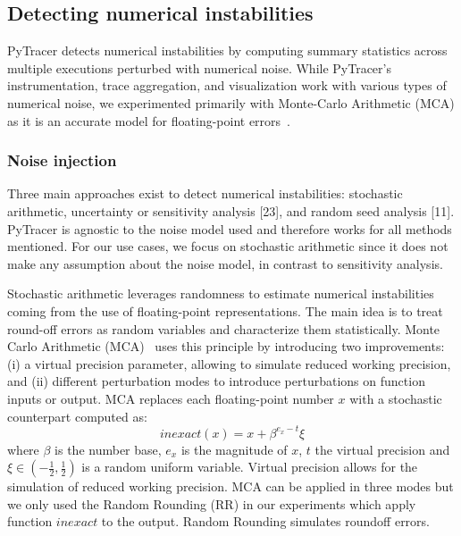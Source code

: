\documentclass[10pt,journal,compsoc]{IEEEtran}
\newcommand{\pytracer}[0]{PyTracer\xspace}
\DeclareRobustCommand{\add}[1]{#1}
\DeclareRobustCommand{\remove}[1]{}
\begin{document}
\subsection{Detecting numerical instabilities}

\pytracer detects numerical instabilities by computing summary statistics across
multiple executions perturbed with numerical noise. While \pytracer's
instrumentation, trace aggregation, and visualization work with various types of
numerical noise, we experimented primarily with Monte-Carlo Arithmetic (MCA) as
it is an accurate model for floating-point errors~\cite{verificarlo}.

\subsubsection{Noise injection}
\label{sec:fuzzy}

Three  main  approaches  exist  to  detect  numerical  instabilities:
stochastic  arithmetic,  uncertainty  or  sensitivity analysis [23], and random
seed analysis [11].  \add{PyTracer is agnostic to the noise model used and therefore
    works for all methods mentioned}.  For our use cases, we focus on stochastic
arithmetic since it does not make any assumption about the noise model, in
contrast to sensitivity analysis\add{.}

Stochastic arithmetic leverages randomness to estimate numerical instabilities
coming from the use of floating-point representations. The main idea is to treat
round-off errors as random variables and characterize them statistically. Monte 
Carlo Arithmetic (MCA)~\cite{parker1997monte} uses this principle by introducing
two improvements: (i) a virtual precision parameter, allowing to simulate
reduced working precision, and (ii) different perturbation modes to introduce
perturbations on function inputs or output. MCA replaces each floating-point
number $x$ with a stochastic counterpart computed as:
\[
    inexact(x) =  x + \beta^{e_x - t}\xi
\]
where $\beta$ is the number base, $e_x$ is the magnitude of $x$, $t$ the virtual
precision and $\xi \in (-\frac{1}{2},\frac{1}{2})$ is a random uniform variable.
Virtual precision allows for the simulation of reduced working precision. MCA
can be applied in three modes \add{but we only used the} Random Rounding (RR) \add{in our
    experiments} \remove{, Precision Bounding (PB), and full MCA,} which apply
function $inexact$ to the output. \remove{, the inputs, or both, respectively.
    While the RR mode is equivalent to stochastic rounding, the PB mode can also
    identify catastrophic cancellations.} \add{Random Rounding simulates roundoff errors.}
\end{document}
